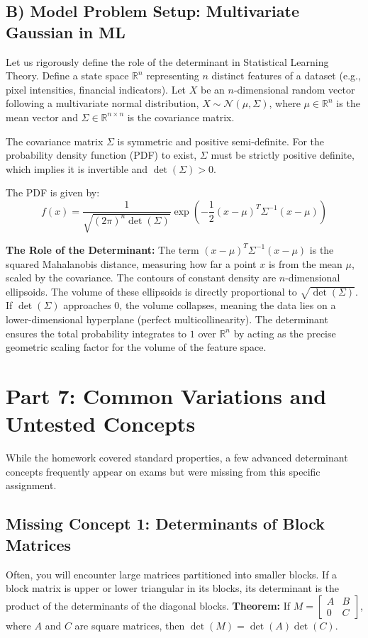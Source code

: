 \documentclass{article}
\begin{document}
\subsection{B) Model Problem Setup: Multivariate Gaussian in ML}
Let us rigorously define the role of the determinant in Statistical Learning Theory. 
Define a state space $\mathbb{R}^n$ representing $n$ distinct features of a dataset (e.g., pixel intensities, financial indicators). Let $X$ be an $n$-dimensional random vector following a multivariate normal distribution, $X \sim \mathcal{N}(\mu, \Sigma)$, where $\mu \in \mathbb{R}^n$ is the mean vector and $\Sigma \in \mathbb{R}^{n \times n}$ is the covariance matrix.

The covariance matrix $\Sigma$ is symmetric and positive semi-definite. For the probability density function (PDF) to exist, $\Sigma$ must be strictly positive definite, which implies it is invertible and $\det(\Sigma) > 0$.

The PDF is given by:
\[ f(x) = \frac{1}{\sqrt{(2\pi)^n \det(\Sigma)}} \exp\left(-\frac{1}{2}(x-\mu)^T \Sigma^{-1} (x-\mu)\right) \]

\textbf{The Role of the Determinant:}
The term $(x-\mu)^T \Sigma^{-1} (x-\mu)$ is the squared Mahalanobis distance, measuring how far a point $x$ is from the mean $\mu$, scaled by the covariance. The contours of constant density are $n$-dimensional ellipsoids. 
The volume of these ellipsoids is directly proportional to $\sqrt{\det(\Sigma)}$. If $\det(\Sigma)$ approaches $0$, the volume collapses, meaning the data lies on a lower-dimensional hyperplane (perfect multicollinearity). The determinant ensures the total probability integrates to $1$ over $\mathbb{R}^n$ by acting as the precise geometric scaling factor for the volume of the feature space.

\newpage
\section{Part 7: Common Variations and Untested Concepts}

While the homework covered standard properties, a few advanced determinant concepts frequently appear on exams but were missing from this specific assignment.

\subsection{Missing Concept 1: Determinants of Block Matrices}
Often, you will encounter large matrices partitioned into smaller blocks. If a block matrix is upper or lower triangular in its blocks, its determinant is the product of the determinants of the diagonal blocks.
\textbf{Theorem:} If $M = \begin{bmatrix} A & B \\ 0 & C \end{bmatrix}$, where $A$ and $C$ are square matrices, then $\det(M) = \det(A)\det(C)$.
\end{document}
